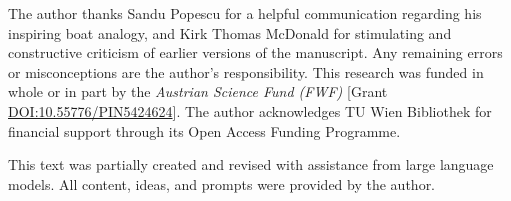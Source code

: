 \documentclass[reprint,aps,pra,longbibliography]{revtex4-2}
\begin{document}
\begin{acknowledgments}
The author thanks Sandu Popescu for a helpful communication regarding his inspiring boat analogy, and Kirk Thomas McDonald for stimulating and constructive criticism of earlier versions of the manuscript. Any remaining errors or misconceptions are the author's responsibility.
This research was funded in whole or in part by the \textit{Austrian Science Fund (FWF)} [Grant \href{https://doi.org/10.55776/PIN5424624}{DOI:10.55776/PIN5424624}].
The author acknowledges TU Wien Bibliothek for financial support through its Open Access Funding Programme.

This text was partially created and revised with assistance from large language models. All content, ideas, and prompts were provided by the author.
\end{acknowledgments}


\end{document}
